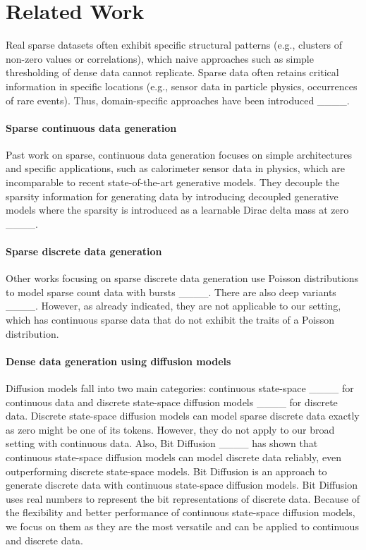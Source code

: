 \section{Related Work}
Real sparse datasets often exhibit specific structural patterns (e.g., clusters of non-zero values or correlations), which naive approaches such as simple thresholding of dense data cannot replicate. Sparse data often retains critical information in specific locations (e.g., sensor data in particle physics, occurrences of rare events). Thus, domain-specific approaches have been introduced ____.

\paragraph{Sparse continuous data generation}
Past work on sparse, continuous data generation focuses on simple architectures and specific applications, such as calorimeter sensor data in physics, which are incomparable to recent state-of-the-art generative models. They decouple the sparsity information for generating data by introducing decoupled generative models where the sparsity is introduced as a learnable Dirac delta mass at zero ____. 

\paragraph{Sparse discrete data generation} Other works focusing on sparse discrete data generation use Poisson distributions to model sparse count data with bursts ____. There are also deep variants ____. However, as already indicated, they are not applicable to our setting, which has continuous sparse data that do not exhibit the traits of a Poisson distribution. 

\paragraph{Dense data generation using diffusion models} Diffusion models fall into two main categories: continuous state-space ____ for continuous data and discrete state-space diffusion models ____ for discrete data. Discrete state-space diffusion models can model sparse discrete data exactly as zero might be one of its tokens. However, they do not apply to our broad setting with continuous data. Also, Bit Diffusion ____ has shown that continuous state-space diffusion models can model discrete data reliably, even outperforming discrete state-space models. Bit Diffusion is an approach to generate discrete data with continuous state-space diffusion models. Bit Diffusion uses real numbers to represent the bit representations of discrete data. Because of the flexibility and better performance of continuous state-space diffusion models, we focus on them as they are the most versatile and can be applied to continuous and discrete data. 


